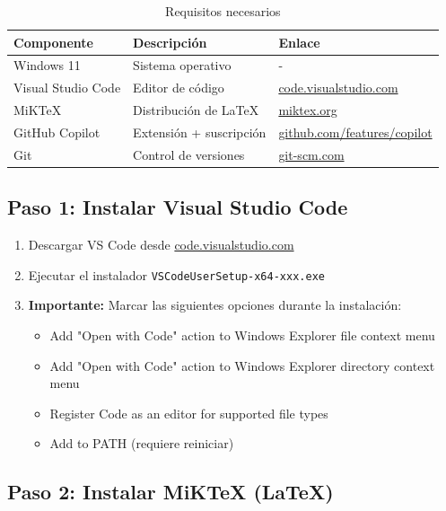 \documentclass[11pt,a4paper]{article}
\newcommand{\codigo}[1]{\texttt{\textcolor{codigo}{#1}}}
\begin{document}
	\begin{table}[H]
		\centering
		\begin{tabular}{@{}lll@{}}
			\toprule
			\textbf{Componente} & \textbf{Descripción} & \textbf{Enlace} \\
			\midrule
			Windows 11 & Sistema operativo & - \\
			Visual Studio Code & Editor de código & \href{https://code.visualstudio.com}{code.visualstudio.com} \\
			MiKTeX & Distribución de LaTeX & \href{https://miktex.org}{miktex.org} \\
			GitHub Copilot & Extensión + suscripción & \href{https://github.com/features/copilot}{github.com/features/copilot} \\
			Git & Control de versiones & \href{https://git-scm.com}{git-scm.com} \\
			\bottomrule
		\end{tabular}
		\caption{Requisitos necesarios}
		\label{tab:requisitos}
	\end{table}
	
	\subsection{Paso 1: Instalar Visual Studio Code}
	
	\begin{enumerate}
		\item Descargar VS Code desde \href{https://code.visualstudio.com}{code.visualstudio.com}
		\item Ejecutar el instalador \codigo{VSCodeUserSetup-x64-xxx.exe}
		\item \textbf{Importante:} Marcar las siguientes opciones durante la instalación:
		\begin{itemize}
			\item \checkmark Add "Open with Code" action to Windows Explorer file context menu
			\item \checkmark Add "Open with Code" action to Windows Explorer directory context menu
			\item \checkmark Register Code as an editor for supported file types
			\item \checkmark Add to PATH (requiere reiniciar)
		\end{itemize}
	\end{enumerate}
	
	\subsection{Paso 2: Instalar MiKTeX (LaTeX)}
	
\end{document}
